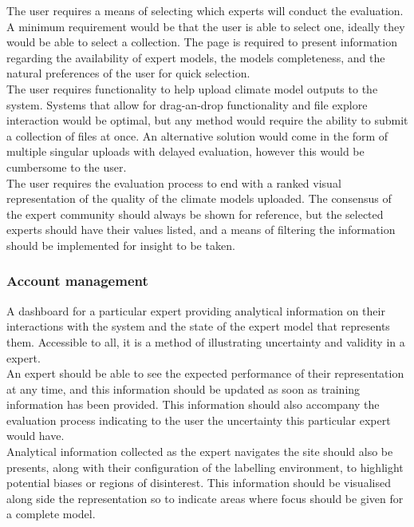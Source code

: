 \documentclass{ecmm427_assignment}
\begin{document}
\noindent The user requires a means of selecting which experts will conduct the evaluation. A minimum requirement would be that the user is able to select one, ideally they would be able to select a collection. The page is required to present information regarding the availability of expert models, the models completeness, and the natural preferences of the user for quick selection.\\

\noindent The user requires functionality to help upload climate model outputs to the system. Systems that allow for drag-an-drop functionality and file explore interaction would be optimal, but any method would require the ability to submit a collection of files at once. An alternative solution would come in the form of multiple singular uploads with delayed evaluation, however this would be cumbersome to the user.\\

\noindent The user requires the evaluation process to end with a ranked visual representation of the quality of the climate models uploaded. The consensus of the expert community should always be shown for reference, but the selected experts should have their values listed, and a means of filtering the information should be implemented for insight to be taken.

\subsubsection{Account management}

A dashboard for a particular expert providing analytical information on their interactions with the system and the state of the expert model that represents them. Accessible to all, it is a method of illustrating uncertainty and validity in a expert.\\

\noindent An expert should be able to see the expected performance of their representation at any time, and this information should be updated as soon as training information has been provided. This information should also accompany the evaluation process indicating to the user the uncertainty this particular expert would have.\\

\noindent Analytical information collected as the expert navigates the site should also be presents, along with their configuration of the labelling environment, to highlight potential biases or regions of disinterest. This information should be visualised along side the representation so to indicate areas where focus should be given for a complete model.\\
\end{document}
